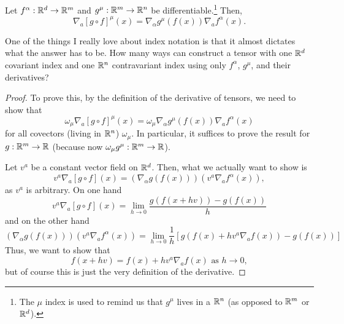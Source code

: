 \begin{prp}\label{ChainRule}
Let $f^\alpha :\mathbb{R} ^d\rightarrow \mathbb{R} ^m$ and $g^\mu :\mathbb{R} ^m\rightarrow \mathbb{R} ^n$ be differentiable.\footnote{The $\mu$ index is used to remind us that $g^\mu$ lives in a $\mathbb{R} ^n$ (as opposed to $\mathbb{R} ^m$ or $\mathbb{R} ^d$).}  Then,
\begin{equation}
\nabla _a[g\circ f]^\mu (x)=\nabla _\alpha g^\mu (f(x))\nabla _af^\alpha (x).
\end{equation}
\begin{rmk}
One of the things I really love about index notation is that it almost dictates what the answer has to be.  How many ways can construct a tensor with one $\mathbb{R} ^d$ covariant index and one $\mathbb{R} ^n$ contravariant index using only $f^\alpha$, $g^\mu$, and their derivatives?
\end{rmk}
\begin{proof}
To prove this, by the definition of the derivative of tensors, we need to show that
\begin{equation}
\omega _\mu \nabla _a[g\circ f]^\mu (x)=\omega _\mu \nabla _\alpha g^\mu (f(x))\nabla _af^\alpha (x)
\end{equation}
for all covectors (living in $\mathbb{R} ^n$) $\omega _\mu$.  In particular, it suffices to prove the result for $g:\mathbb{R} ^m\rightarrow \mathbb{R}$ (because now $\omega _\mu g^\mu :\mathbb{R} ^m\rightarrow \mathbb{R}$).

Let $v^a$ be a constant vector field on $\mathbb{R} ^d$.  Then, what we actually want to show is
\begin{equation}
v^a\nabla _a[g\circ f](x)=\left( \nabla _\alpha g(f(x))\right) \left( v^a\nabla _af^\alpha (x)\right) ,
\end{equation}
as $v^a$ is arbitrary.  On one hand
\begin{equation}\label{5.2.18}
v^a\nabla _a[g\circ f](x)=\lim _{h\to 0}\frac{g\left( f(x+hv)\right) -g(f(x))}{h}
\end{equation}
and on the other hand
\begin{equation}
\left( \nabla _\alpha g(f(x))\right) \left( v^a\nabla _af^\alpha (x)\right) =\lim _{h\to 0}\frac{1}{h}\left[ g\left( f(x)+hv^a\nabla _af(x)\right) -g(f(x))\right]
\end{equation}
Thus, we want to show that
\begin{equation}
f(x+hv)=f(x)+hv^a\nabla _af(x)\text{ as }h\to 0,
\end{equation}
but of course this is just the very definition of the derivative.
\end{proof}
\end{prp}

